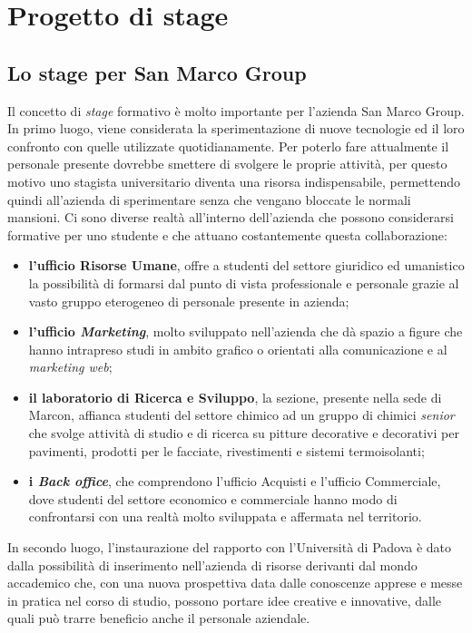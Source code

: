 
\chapter{Progetto di stage}
\label{cap:progetto-di-stage}


\section{Lo stage per San Marco Group}

Il concetto di \textit{stage} formativo è molto importante per l'azienda San Marco Group. 
In primo luogo, viene considerata la sperimentazione di nuove tecnologie ed il loro confronto con quelle utilizzate quotidianamente. Per poterlo fare attualmente il personale presente dovrebbe smettere di svolgere le proprie attività, per questo motivo uno stagista universitario diventa una risorsa indispensabile, permettendo quindi all'azienda di sperimentare senza che vengano bloccate le normali mansioni.
Ci sono diverse realtà all'interno dell'azienda che possono considerarsi formative per uno studente e che attuano costantemente questa collaborazione:
\begin{itemize}
	\item \textbf{l'ufficio Risorse Umane}, offre a studenti del settore giuridico ed umanistico la possibilità di formarsi dal punto di vista professionale e personale grazie al vasto gruppo eterogeneo di personale presente in azienda; 
	\item \textbf{l'ufficio \textit{Marketing}}, molto sviluppato nell'azienda che dà spazio a figure che hanno intrapreso studi in ambito grafico o orientati alla comunicazione e al \textit{marketing web};
	\item \textbf{il laboratorio di Ricerca e Sviluppo}, la sezione, presente nella sede di Marcon, affianca studenti del settore chimico ad un gruppo di chimici \textit{senior} che svolge attività di studio e di ricerca su pitture decorative e decorativi per pavimenti, prodotti per le facciate, rivestimenti e sistemi termoisolanti; 
	\item \textbf{i \textit{Back office}}, che comprendono l'ufficio Acquisti e l'ufficio Commerciale, dove studenti del settore economico e commerciale hanno modo di confrontarsi con una realtà molto sviluppata e affermata nel territorio.
\end{itemize}
In secondo luogo, l'instaurazione del rapporto con l'Università di Padova è dato dalla possibilità di inserimento nell'azienda di risorse derivanti dal mondo accademico che, con una nuova prospettiva data dalle conoscenze apprese e messe in pratica nel corso di studio, possono portare idee creative e innovative, dalle quali può trarre beneficio anche il personale aziendale.

